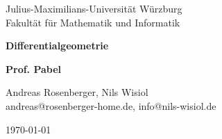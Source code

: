\begin{titlepage}
  Julius-Maximilians-Universität Würzburg\\
  Fakultät für Mathematik und Informatik
  
  \vspace{3cm}
  
  \begin{center}
   \LARGE\textbf{Differentialgeometrie}
  \end{center}
  
  \vspace{0cm}
  
  \begin{center}
   \huge\textbf{Prof. Pabel}
  \end{center}
  
  \vspace{1cm}
  
  \begin{center}
   \Large Andreas Rosenberger, Nils Wisiol \\
   \footnotesize andreas@rosenberger-home.de, info@nils-wisiol.de
  \end{center}
  
  \vspace{0cm}
  
  \begin{center}
   \Large \today
  \end{center}
  
  
\end{titlepage}
